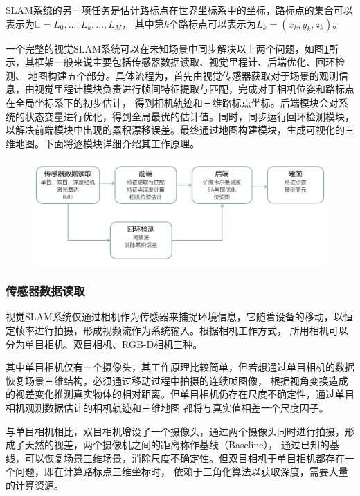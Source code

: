 SLAM系统的另一项任务是估计路标点在世界坐标系中的坐标，路标点的集合可以表示为$\mathbb{L}=L_{0},...,L_{k},...,L_{M}$，
其中第$k$个路标点可以表示为$L_{k}=(x_{k},y_{k},z_{k})$。

一个完整的视觉SLAM系统可以在未知场景中同步解决以上两个问题，如图\ref{fig:SLAMflow}所示，其框架一般来说主要包括传感器数据读取、视觉里程计、后端优化、回环检测、
地图构建五个部分。具体流程为，首先由视觉传感器获取对于场景的观测信息，由视觉里程计模块负责进行帧间特征提取与匹配，完成对于相机位姿和路标点在全局坐标系下的初步估计，
得到相机轨迹和三维路标点坐标。后端模块会对系统的状态变量进行优化，得到全局最优的估计值。同时，同步运行回环检测模块，
以解决前端模块中出现的累积漂移误差。最终通过地图构建模块，生成可视化的三维地图。下面将逐模块详细介绍其工作原理。
\begin{figure}[!htbp]
    \centering
    \includegraphics[width=\textwidth]{Img/2-SLAMflow.png}
    \label{fig:SLAMflow}
\end{figure}
\subsubsection{传感器数据读取}
视觉SLAM系统仅通过相机作为传感器来捕捉环境信息，它随着设备的移动，以恒定帧率进行拍摄，形成视频流作为系统输入。根据相机工作方式，
所用相机可以分为单目相机、双目相机、RGB-D相机三种。

其中单目相机仅有一个摄像头，其工作原理比较简单，但若想通过单目相机的数据恢复场景三维结构，必须通过移动过程中拍摄的连续帧图像，
根据视角变换造成的视差变化推测真实物体的相对距离。但单目相机仍存在尺度不确定性，通过单目相机观测数据估计的相机轨迹和三维地图
都将与真实值相差一个尺度因子。

与单目相机相比，双目相机增设了一个摄像头，通过两个摄像头同时进行拍摄，形成了天然的视差，两个摄像机之间的距离称作基线（Baseline），
通过已知的基线，可以恢复场景三维场景，消除尺度不确定性。但双目相机于单目相机都存在一个问题，即在计算路标点三维坐标时，
依赖于三角化算法以获取深度，需要大量的计算资源。

